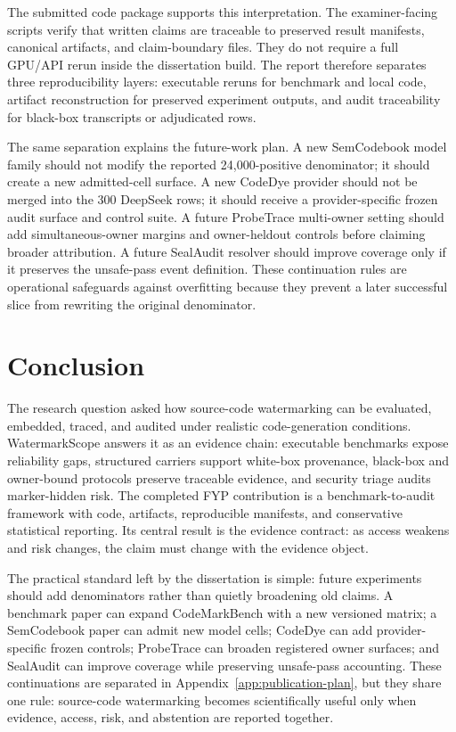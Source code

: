 The submitted code package supports this interpretation. The examiner-facing scripts verify that written claims are traceable to preserved result manifests, canonical artifacts, and claim-boundary files. They do not require a full GPU/API rerun inside the dissertation build. The report therefore separates three reproducibility layers: executable reruns for benchmark and local code, artifact reconstruction for preserved experiment outputs, and audit traceability for black-box transcripts or adjudicated rows.

The same separation explains the future-work plan. A new SemCodebook model family should not modify the reported 24,000-positive denominator; it should create a new admitted-cell surface. A new CodeDye provider should not be merged into the 300 DeepSeek rows; it should receive a provider-specific frozen audit surface and control suite. A future ProbeTrace multi-owner setting should add simultaneous-owner margins and owner-heldout controls before claiming broader attribution. A future SealAudit resolver should improve coverage only if it preserves the unsafe-pass event definition. These continuation rules are operational safeguards against overfitting because they prevent a later successful slice from rewriting the original denominator.

\section{Conclusion}

The research question asked how source-code watermarking can be evaluated, embedded, traced, and audited under realistic code-generation conditions. WatermarkScope answers it as an evidence chain: executable benchmarks expose reliability gaps, structured carriers support white-box provenance, black-box and owner-bound protocols preserve traceable evidence, and security triage audits marker-hidden risk. The completed FYP contribution is a benchmark-to-audit framework with code, artifacts, reproducible manifests, and conservative statistical reporting. Its central result is the evidence contract: as access weakens and risk changes, the claim must change with the evidence object.

The practical standard left by the dissertation is simple: future experiments should add denominators rather than quietly broadening old claims. A benchmark paper can expand CodeMarkBench with a new versioned matrix; a SemCodebook paper can admit new model cells; CodeDye can add provider-specific frozen controls; ProbeTrace can broaden registered owner surfaces; and SealAudit can improve coverage while preserving unsafe-pass accounting. These continuations are separated in Appendix~\ref{app:publication-plan}, but they share one rule: source-code watermarking becomes scientifically useful only when evidence, access, risk, and abstention are reported together.

